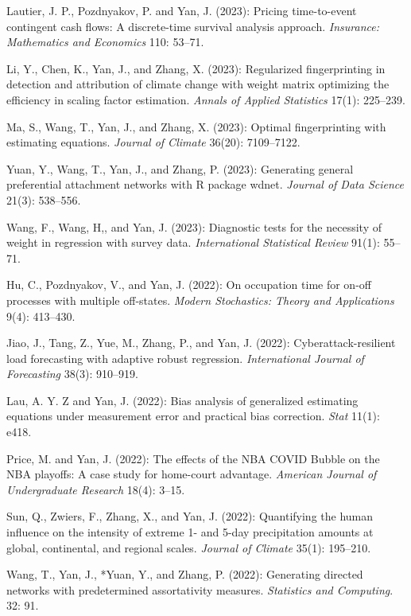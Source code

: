 \documentclass[Statistics]{vita}
\begin{document}
\begin{vita}
\begin{Publications}
\begin{RefereedJournalArticles}
  \item *Lautier, J. P., Pozdnyakov, P. and Yan, J. (2023): Pricing time-to-event contingent cash flows: A discrete-time survival analysis approach. {\em Insurance: Mathematics and Economics\/} 110: 53--71.
  \item *Li, Y., Chen, K., Yan, J., and Zhang, X. (2023): Regularized fingerprinting in detection and attribution of climate change with weight matrix optimizing the efficiency in scaling factor estimation. {\em Annals of Applied Statistics\/} 17(1): 225--239.
   \item *Ma, S., Wang, T., Yan, J., and Zhang, X. (2023): Optimal fingerprinting with estimating equations. {\em Journal of Climate\/} 36(20): 7109--7122.
  \item *Yuan, Y., Wang, T., Yan, J., and Zhang, P. (2023): Generating general preferential attachment networks with R package {wdnet}. {\em Journal of Data Science\/} 21(3): 538--556.
  \item *Wang, F., Wang, H,, and Yan, J. (2023): Diagnostic tests for the necessity of weight in regression with survey data. {\em International Statistical Review\/} 91(1): 55--71.
  \item *Hu, C., Pozdnyakov, V., and Yan, J. (2022): On occupation time for on-off processes with multiple off-states. {\em Modern Stochastics: Theory and Applications\/} 9(4): 413--430.
  \item *Jiao, J., Tang, Z., Yue, M., Zhang, P., and Yan, J. (2022): Cyberattack-resilient load forecasting with adaptive robust regression. {\em International Journal of Forecasting\/} 38(3): 910--919.
  \item *Lau, A. Y. Z and Yan, J. (2022): Bias analysis of generalized estimating equations under measurement error and practical bias correction. {\em Stat\/} 11(1): e418.
  \item *Price, M. and Yan, J. (2022): The effects of the NBA COVID Bubble on the NBA playoffs: A case study for home-court advantage. {\em American Journal of Undergraduate Research\/} 18(4): 3--15.
  \item Sun, Q., Zwiers, F., Zhang, X., and Yan, J. (2022): Quantifying the human influence on the intensity of extreme 1- and 5-day precipitation amounts at global, continental, and regional scales. {\em Journal of Climate\/} 35(1): 195--210.
  \item Wang, T., Yan, J., *Yuan, Y., and Zhang, P. (2022): Generating directed networks with predetermined assortativity measures. {\em Statistics and Computing}. 32: 91.

\end{RefereedJournalArticles}
\end{Publications}
\end{vita}
\end{document}
